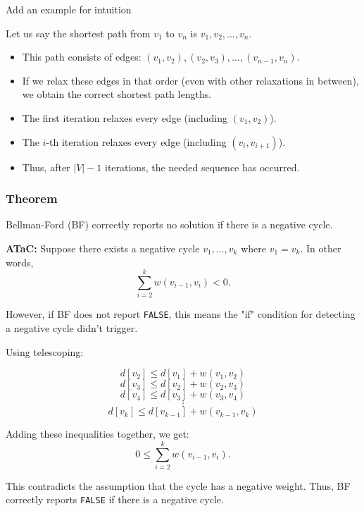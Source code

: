 \begin{example}
    Add an example for intuition
\end{example}

\begin{intuition}
    Let us say the shortest path from \( v_1 \) to \( v_n \) is \( v_1, v_2, \dots, v_n \).

    \begin{itemize}
        \item This path consists of edges: \( (v_1, v_2), (v_2, v_3), \dots, (v_{n-1}, v_n) \).
        
        \item If we relax these edges in that order (even with other relaxations in between), we obtain the correct shortest path lengths.
        
        \item The first iteration relaxes every edge (including \( (v_1, v_2) \)).
        
        \item The \( i \)-th iteration relaxes every edge (including \( (v_i, v_{i+1}) \)).
        
        \item Thus, after \( |V| - 1 \) iterations, the needed sequence has occurred.
    \end{itemize}
\end{intuition}

\subsubsection{Theorem}
\begin{theorem}
    Bellman-Ford (BF) correctly reports no solution if there is a negative cycle.
\end{theorem}

\begin{derivation}
    \textbf{ATaC:} Suppose there exists a negative cycle \( v_1, \dots, v_k \) where \( v_1 = v_k \). In other words, 
    \[
    \sum_{i=2}^{k} w(v_{i-1}, v_i) < 0.
    \]

    However, if BF does not report \texttt{FALSE}, this means the "if" condition for detecting a negative cycle didn't trigger.

    Using telescoping:

    \[
    d[v_2] \leq d[v_1] + w(v_1, v_2)
    \]
    \[
    d[v_3] \leq d[v_2] + w(v_2, v_3)
    \]
    \[
    d[v_4] \leq d[v_3] + w(v_3, v_4)
    \]
    \[
    \vdots
    \]
    \[
    d[v_k] \leq d[v_{k-1}] + w(v_{k-1}, v_k)
    \]

    Adding these inequalities together, we get:
    \[
    0 \leq \sum_{i=2}^{k} w(v_{i-1}, v_i).
    \]

    This contradicts the assumption that the cycle has a negative weight. Thus, BF correctly reports \texttt{FALSE} if there is a negative cycle.
\end{derivation}

